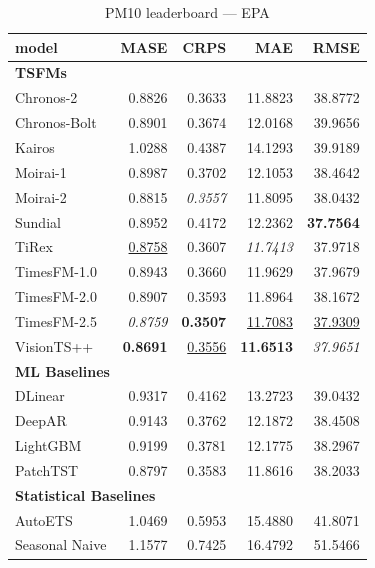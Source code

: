\begin{table}[H]
\caption{PM10 leaderboard --- EPA}
\centering
\begin{small}
\begin{tabular}{lrrrr}
\toprule
model & MASE & CRPS & MAE & RMSE \\
\midrule
\multicolumn{5}{l}{\textbf{TSFMs}} \\
Chronos-2 & 0.8826 & 0.3633 & 11.8823 & 38.8772 \\
Chronos-Bolt & 0.8901 & 0.3674 & 12.0168 & 39.9656 \\
Kairos & 1.0288 & 0.4387 & 14.1293 & 39.9189 \\
Moirai-1 & 0.8987 & 0.3702 & 12.1053 & 38.4642 \\
Moirai-2 & 0.8815 & \textit{0.3557} & 11.8095 & 38.0432 \\
Sundial & 0.8952 & 0.4172 & 12.2362 & \textbf{37.7564} \\
TiRex & \underline{0.8758} & 0.3607 & \textit{11.7413} & 37.9718 \\
TimesFM-1.0 & 0.8943 & 0.3660 & 11.9629 & 37.9679 \\
TimesFM-2.0 & 0.8907 & 0.3593 & 11.8964 & 38.1672 \\
TimesFM-2.5 & \textit{0.8759} & \textbf{0.3507} & \underline{11.7083} & \underline{37.9309} \\
VisionTS++ & \textbf{0.8691} & \underline{0.3556} & \textbf{11.6513} & \textit{37.9651} \\
\midrule
\multicolumn{5}{l}{\textbf{ML Baselines}} \\
DLinear & 0.9317 & 0.4162 & 13.2723 & 39.0432 \\
DeepAR & 0.9143 & 0.3762 & 12.1872 & 38.4508 \\
LightGBM & 0.9199 & 0.3781 & 12.1775 & 38.2967 \\
PatchTST & 0.8797 & 0.3583 & 11.8616 & 38.2033 \\
\midrule
\multicolumn{5}{l}{\textbf{Statistical Baselines}} \\
AutoETS & 1.0469 & 0.5953 & 15.4880 & 41.8071 \\
Seasonal Naive & 1.1577 & 0.7425 & 16.4792 & 51.5466 \\
\bottomrule
\end{tabular}
\end{small}
\end{table}